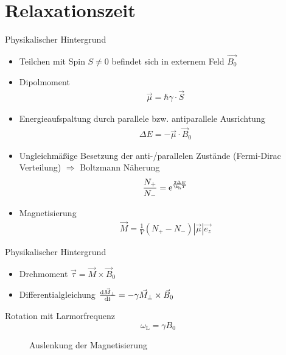 
\thispagestyle{empty}
\frame{\titlepage}


\section{Relaxationszeit}
\begin{frame}{Physikalischer Hintergrund}
	\begin{itemize}
	\item Teilchen mit Spin $S\neq 0$ befindet sich in externem Feld $\vec{B_{0}}$
	\item Dipolmoment
		\begin{align*}
		\vec{\mu}=\hbar\gamma\cdot\vec{S}
		\end{align*}
	\item Energieaufspaltung durch parallele bzw. antiparallele Ausrichtung
		\begin{align*}
		\Delta E = -\vec{\mu}\cdot\vec{B}_0
		\end{align*}
	\item Ungleichmäßige Besetzung der anti-/parallelen Zustände (Fermi-Dirac Verteilung)
		$\Rightarrow$ Boltzmann Näherung
		\begin{align*}
		\frac{N_+}{N_-}=\e{\frac{2\Delta E}{\k_\text{b} T}}
		\end{align*}
	 \item Magnetisierung 
		\begin{align*}
		\vec{M}=\frac{1}{V}(N_+-N_-)|\vec{\mu}|\vec{e_{z}}
		\end{align*}
	\end{itemize}
\end{frame}

\begin{frame}{Physikalischer Hintergrund}
	\begin{itemize}
	\item Drehmoment $\vec{\tau}=\vec{M}\times\vec{B}_0$
	\item Differentialgleichung $\dv{\vec{M}_\bot}{t}=-\gamma\vec{M}_\bot\times\vec{B}_0$
	\end{itemize}
	\begin{block}{Rotation mit Larmorfrequenz}
		\[
		\omega_\text{L}=\gamma B_0
		\]
	\end{block}
	\begin{figure}
	
	\caption{Auslenkung der Magnetisierung}
	\end{figure}
\end{frame}

